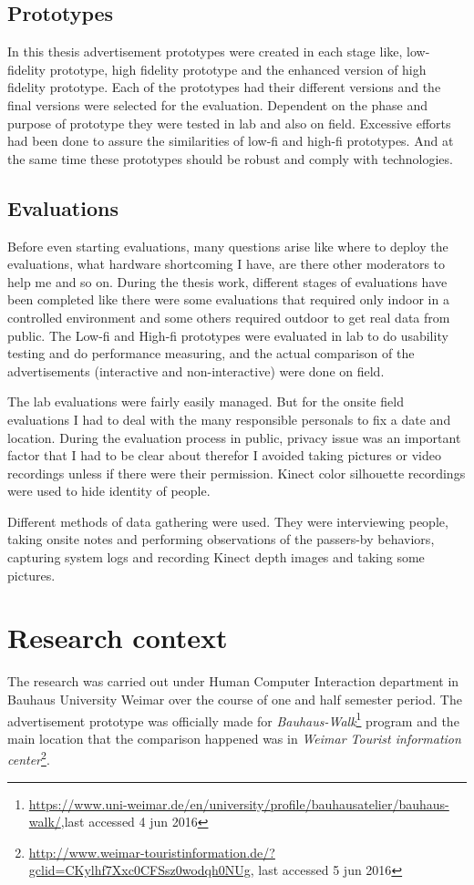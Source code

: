 \subsection{Prototypes}
In this thesis advertisement prototypes were created in each stage like, low-fidelity prototype, high fidelity prototype and the enhanced version of high fidelity prototype. Each of the prototypes had their different versions and the final versions were selected for the evaluation. Dependent on the phase and purpose of prototype they were tested in lab and also on field. Excessive efforts had been done to assure the similarities of low-fi and high-fi prototypes. And at the same time these prototypes should be robust and comply with technologies.  


\subsection{Evaluations}
Before even starting evaluations, many questions arise like where to deploy the evaluations, what hardware shortcoming I have, are there other moderators to help me and so on. During the thesis work, different stages of evaluations have been completed like there were some evaluations that required only indoor in a controlled environment and some others required outdoor to get real data from public. The Low-fi and High-fi prototypes were evaluated in lab to do usability testing and do performance measuring, and the actual comparison of the advertisements (interactive and non-interactive) were done on field. 

The lab evaluations were fairly easily managed. But for the onsite field evaluations I had to deal with the many responsible personals to fix a date and location. During the evaluation process in public, privacy issue was an important factor that I had to be clear about therefor I avoided taking pictures or video recordings unless if there were their permission. Kinect color silhouette recordings were used to hide identity of people.

Different methods of data gathering were used. They were interviewing people, taking onsite notes and performing observations of the passers-by behaviors, capturing system logs and recording Kinect depth images and taking some pictures.



\section{Research context}
The research was carried out under Human Computer Interaction department in Bauhaus University Weimar over the course of one and half semester period. The advertisement prototype was officially made for \emph{Bauhaus-Walk}\footnote{\url{ https://www.uni-weimar.de/en/university/profile/bauhausatelier/bauhaus-walk/},last accessed 4 jun 2016} program and the main location that the comparison happened was in \emph{Weimar Tourist information center}\footnote{\url{ http://www.weimar-touristinformation.de/?gclid=CKylhf7Xxc0CFSsz0wodqh0NUg}, last accessed 5 jun 2016}.


